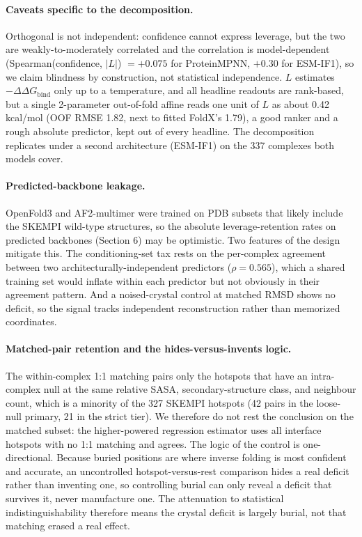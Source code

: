 \documentclass{article} %
\begin{document}
\paragraph{Caveats specific to the decomposition.} Orthogonal is not independent: confidence cannot express
leverage, but the two are weakly-to-moderately correlated and the correlation is model-dependent
(Spearman(confidence, $|L|$) $= +0.075$ for ProteinMPNN, $+0.30$ for ESM-IF1), so we claim blindness by
construction, not statistical independence. $L$ estimates $-\Delta\Delta G_{\text{bind}}$ only up to a
temperature, and all headline readouts are rank-based, but a single 2-parameter out-of-fold affine reads one unit
of $L$ as about 0.42 kcal/mol (OOF RMSE 1.82, next to fitted FoldX's 1.79), a good ranker and a rough absolute
predictor, kept out of every headline. The decomposition replicates under a second architecture (ESM-IF1) on the
337 complexes both models cover.

\paragraph{Predicted-backbone leakage.} OpenFold3 and AF2-multimer were trained on PDB subsets that likely include
the SKEMPI wild-type structures, so the absolute leverage-retention rates on predicted backbones (Section 6) may be
optimistic. Two features of the design mitigate this. The conditioning-set tax rests on the per-complex agreement
between two architecturally-independent predictors ($\rho = 0.565$), which a shared training set would inflate
within each predictor but not obviously in their agreement pattern. And a noised-crystal control at matched RMSD
shows no deficit, so the signal tracks independent reconstruction rather than memorized coordinates.

\paragraph{Matched-pair retention and the hides-versus-invents logic.} The within-complex 1:1 matching pairs only
the hotspots that have an intra-complex null at the same relative SASA, secondary-structure class, and neighbour
count, which is a minority of the 327 SKEMPI hotspots (42 pairs in the loose-null primary, 21 in the strict tier).
We therefore do not rest the conclusion on the matched subset: the higher-powered regression estimator uses all
interface hotspots with no 1:1 matching and agrees. The logic of the control is one-directional. Because buried
positions are where inverse folding is most confident and accurate, an uncontrolled hotspot-versus-rest comparison
hides a real deficit rather than inventing one, so controlling burial can only reveal a deficit that survives it,
never manufacture one. The attenuation to statistical indistinguishability therefore means the crystal deficit is
largely burial, not that matching erased a real effect.
\end{document}
